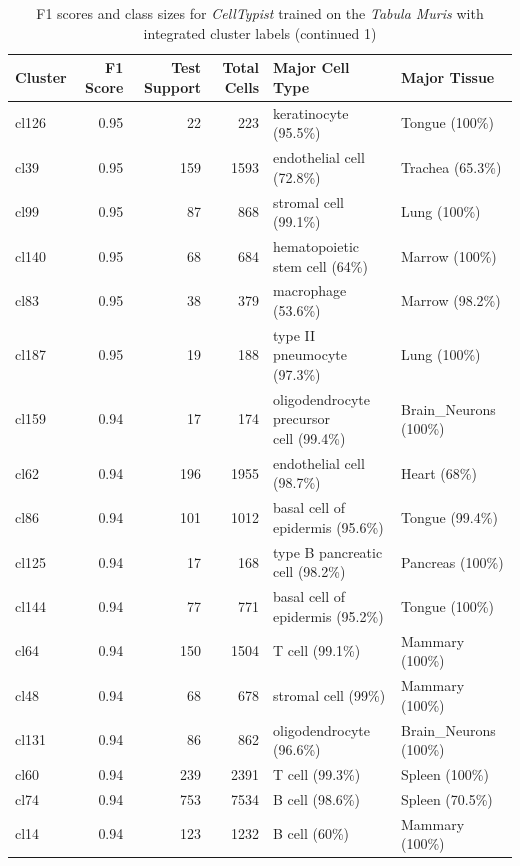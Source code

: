 \begin{table}[ht!]
\scriptsize
\caption[F1 scores and class sizes for \textit{CellTypist} trained on the \textit{Tabula Muris} with integrated cluster labels (continued 1)]{F1 scores and class sizes for \textit{CellTypist} trained on the \textit{Tabula Muris} with integrated cluster labels (continued 1)}
\centering
\label{table:tab_tmmodelclust1}
\begin{tabular}{lrrrll}
  \toprule
Cluster & F1 Score & Test Support & Total Cells & Major Cell Type & Major Tissue \\
  \midrule
  cl126 & 0.95 &  22 & 223 & keratinocyte (95.5\%) & Tongue (100\%) \\ 
  cl39 & 0.95 & 159 & 1593 & endothelial cell (72.8\%) & Trachea (65.3\%) \\ 
  cl99 & 0.95 &  87 & 868 & stromal cell (99.1\%) & Lung (100\%) \\ 
  cl140 & 0.95 &  68 & 684 & hematopoietic stem cell (64\%) & Marrow (100\%) \\ 
  cl83 & 0.95 &  38 & 379 & macrophage (53.6\%) & Marrow (98.2\%) \\ 
  cl187 & 0.95 &  19 & 188 & type II pneumocyte (97.3\%) & Lung (100\%) \\ 
  cl159 & 0.94 &  17 & 174 & \specialcell[t]{oligodendrocyte precursor\\cell (99.4\%)} & Brain\_Neurons (100\%) \\ 
  cl62 & 0.94 & 196 & 1955 & endothelial cell (98.7\%) & Heart (68\%) \\ 
  cl86 & 0.94 & 101 & 1012 & basal cell of epidermis (95.6\%) & Tongue (99.4\%) \\ 
  cl125 & 0.94 &  17 & 168 & type B pancreatic cell (98.2\%) & Pancreas (100\%) \\ 
  cl144 & 0.94 &  77 & 771 & basal cell of epidermis (95.2\%) & Tongue (100\%) \\ 
  cl64 & 0.94 & 150 & 1504 & T cell (99.1\%) & Mammary (100\%) \\ 
  cl48 & 0.94 &  68 & 678 & stromal cell (99\%) & Mammary (100\%) \\ 
  cl131 & 0.94 &  86 & 862 & oligodendrocyte (96.6\%) & Brain\_Neurons (100\%) \\ 
  cl60 & 0.94 & 239 & 2391 & T cell (99.3\%) & Spleen (100\%) \\ 
  cl74 & 0.94 & 753 & 7534 & B cell (98.6\%) & Spleen (70.5\%) \\ 
  cl14 & 0.94 & 123 & 1232 & B cell (60\%) & Mammary (100\%) \\ 

\end{tabular}
\end{table}
